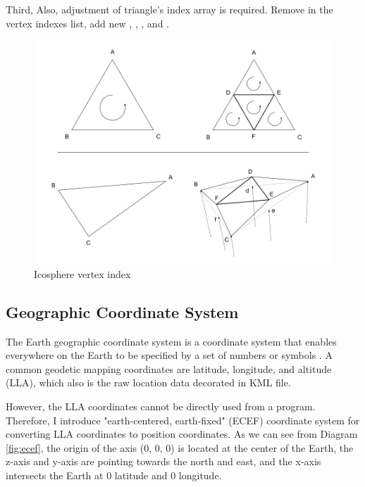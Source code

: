 Third, Also, adjustment of triangle's index array is required. Remove  in the vertex indexes list, add new , , , and .

\begin{figure}[H]
\caption{Icosphere vertex index}
\label{fig:icosphere-vertex-index}
\centering
\includegraphics[width=\textwidth, keepaspectratio]{Figures/icosphere-vertex-index.png}
\decoRule
\end{figure}

\subsection{Geographic Coordinate System}

The Earth geographic coordinate system is a coordinate system that enables everywhere on the Earth to be specified by a set of numbers or symbols \cite{wiki.geographic-coordinate-system.2016}. A common geodetic mapping coordinates are latitude, longitude, and altitude (LLA), which also is the raw location data decorated in KML file.

However, the LLA coordinates cannot be directly used from a program. Therefore, I introduce "earth-centered, earth-fixed" (ECEF) coordinate system for converting LLA coordinates to position coordinates. As we can see from Diagram \ref{fig:ecef}, the origin of the axis (0, 0, 0) is located at the center of the Earth, the z-axis and y-axis are pointing towards the north and east, and the x-axis intersects the Earth at $0$ latitude and $0$ longitude.

